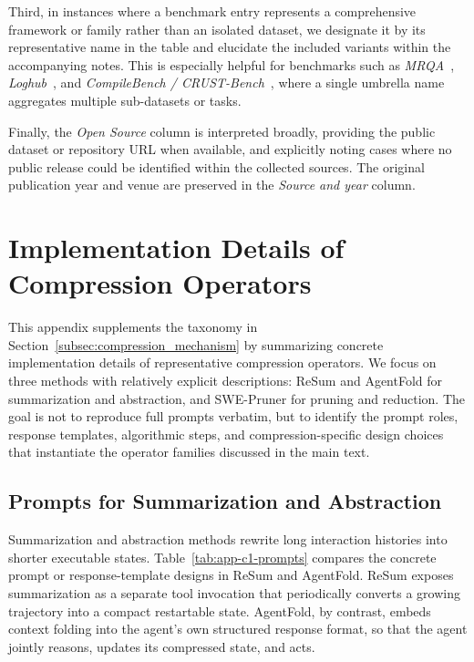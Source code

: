Third, in instances where a benchmark entry represents a comprehensive framework or family rather than an isolated dataset, we designate it by its representative name in the table and elucidate the included variants within the accompanying notes. This is especially helpful for benchmarks such as \emph{MRQA}~\citep{fisch-etal-2019-mrqa}, \emph{Loghub}~\citep{zhu2023loghub}, and \emph{CompileBench / CRUST-Bench}~\citep{khatry2025crustbench}, where a single umbrella name aggregates multiple sub-datasets or tasks.

Finally, the \emph{Open Source} column is interpreted broadly, providing the public dataset or repository URL when available, and explicitly noting cases where no public release could be identified within the collected sources. The original publication year and venue are preserved in the \emph{Source and year} column.


\section{Implementation Details of Compression Operators}
\label{app:operator-details}

This appendix supplements the taxonomy in Section~\ref{subsec:compression_mechanism} by summarizing concrete implementation details of representative compression operators. We focus on three methods with relatively explicit descriptions: ReSum \citep{wu2026resumunlockinglonghorizonsearch} and AgentFold  \citep{ye2025agentfoldlonghorizonwebagents} for summarization and abstraction, and SWE-Pruner \citep{wang2026sweprunerselfadaptivecontextpruning} for pruning and reduction. The goal is not to reproduce full prompts verbatim, but to identify the prompt roles, response templates, algorithmic steps, and compression-specific design choices that instantiate the operator families discussed in the main text.

\subsection{Prompts for Summarization and Abstraction}
\label{app:prompts-summarization}

Summarization and abstraction methods rewrite long interaction histories into shorter executable states. Table~\ref{tab:app-c1-prompts} compares the concrete prompt or response-template designs in ReSum and AgentFold. ReSum exposes summarization as a separate tool invocation that periodically converts a growing trajectory into a compact restartable state. AgentFold, by contrast, embeds context folding into the agent's own structured response format, so that the agent jointly reasons, updates its compressed state, and acts.

